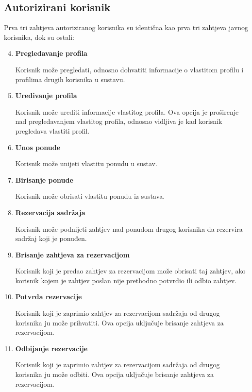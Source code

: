 \documentclass[times, utf8, zavrsni, numeric]{fer}
\newcommand{\razmaks}{\vspace{10pt}}
\newcommand{\uvlakas}{\hspace{0.5cm}}
\begin{document}
\subsection{Autorizirani korisnik}

Prva tri zahtjeva autoriziranog korisnika su identična kao prva tri zahtjeva javnog korisnika, dok su ostali:

\razmaks
\begin{enumerate} \setcounter{enumi}{3}
  \item \textbf{Pregledavanje profila} \par
    \uvlakas Korisnik može pregledati, odnosno dohvatiti informacije o vlastitom profilu i profilima drugih korisnika u sustavu.

  \item \textbf{Uređivanje profila} \par
    \uvlakas Korisnik može urediti informacije vlastitog profila.
      Ova opcija je proširenje nad pregledavanjem vlastitog profila, odnosno vidljiva je kad korisnik pregledava vlastiti profil.

  \item \textbf{Unos ponude} \par
    \uvlakas Korisnik može unijeti vlastitu ponudu u sustav.

  \item \textbf{Birisanje ponude} \par
    \uvlakas Korisnik može obrisati vlastitu ponudu iz sustava.

  \item \textbf{Rezervacija sadržaja} \par
    \uvlakas Korisnik može podnijeti zahtjev nad ponudom drugog korisnika da rezervira sadržaj koji je ponuđen.

  \item \textbf{Brisanje zahtjeva za rezervacijom} \par
    \uvlakas Korisnik koji je predao zahtjev za rezervacijom može obrisati taj zahtjev, ako korisnik kojem je zahtjev poslan nije prethodno potvrdio ili odbio zahtjev.

  \item \textbf{Potvrda rezervacije} \par
    \uvlakas Korisnik koji je zaprimio zahtjev za rezervacijom sadržaja od drugog korisnika ju može prihvatiti.
      Ova opcija uključuje brisanje zahtjeva za rezervacijom.

  \item \textbf{Odbijanje rezervacije} \par
    \uvlakas Korisnik koji je zaprimio zahtjev za rezervacijom sadržaja od drugog korisnika ju može odbiti.
      Ova opcija uključuje brisanje zahtjeva za rezervacijom.

\end{enumerate}
\razmaks
\end{document}
